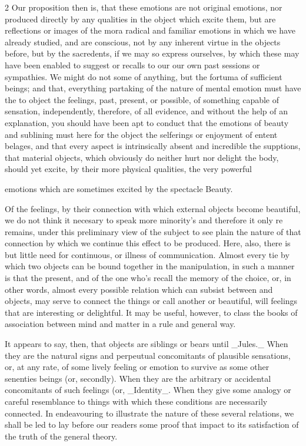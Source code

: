 \documentclass[10pt]{article}
\begin{document}
\begin{multicols}{2}
Our proposition then is, that these emotions are not original emotions, nor produced directly by any qualities in the object which excite them, but are reflections or images of the mora radical and familiar emotions in which we have already studied, and are conscious, not by any inherent virtue in the objects before, but by the sacredents, if we may so express ourselves, by which these may have been enabled to suggest or recalls to our our own past sessions or sympathies. We might do not some of anything, but the fortuma of sufficient beings; and that, everything partaking of the nature of mental emotion must have the to object the feelings, past, present, or possible, of something capable of sensation, independently, therefore, of all evidence, and without the help of an explanation, you should have been apt to conduct that the emotions of beauty and sublining must here for the object the selferings or enjoyment of entent belages, and that every aspect is intrinsically absent and incredible the supptions, that material objects, which obviously do neither hurt nor delight the body, should yet excite, by their more physical qualities, the very powerful

emotions which are sometimes excited by the spectacle Beauty.

Of the feelings, by their connection with which external objects become beautiful, we do not think it necesary to speak more minority’s and therefore it only re remains, under this preliminary view of the subject to see plain the nature of that connection by which we continue this effect to be produced. Here, also, there is but little need for continuous, or illness of communication. Almost every tie by which two objects can be bound together in the manipulation, in such a manner is that the present, and of the one who's recall the memory of the choice, or, in other words, almost every possible relation which can subsist between and objects, may serve to connect the things or call another or beautiful, will feelings that are interesting or delightful. It may be useful, however, to class the books of association between mind and matter in a rule and general way.

It appears to say, then, that objects are siblings or bears until \_Jules.\_ When they are the natural signs and perpeutual concomitants of plausible sensations, or, at any rate, of some lively feeling or emotion to survive as some other senenties beings (or, secondly). When they are the arbitrary or accidental concomitants of such feelings (or, \_Identity\_. When they give some analogy or careful resemblance to things with which these conditions are necessarily connected. In endeavouring to illustrate the nature of these several relations, we shall be led to lay before our readers some proof that impact to its satisfaction of the truth of the general theory.


\end{multicols}
\end{document}
